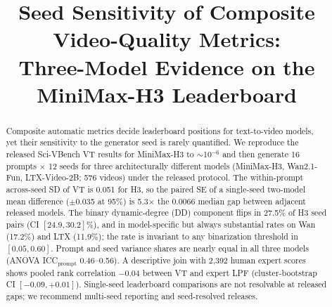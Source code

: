 \documentclass[conference]{IEEEtran}
\begin{document}
\title{Seed Sensitivity of Composite Video-Quality Metrics:\\
Three-Model Evidence on the MiniMax-H3 Leaderboard}
\author{
}
\maketitle

\begin{abstract}
Composite automatic metrics decide leaderboard positions for text-to-video
models, yet their sensitivity to the generator seed is rarely quantified. We
reproduce the released Sci-VBench VT results for MiniMax-H3 to
$\sim$10$^{-6}$ and then generate 16 prompts $\times$ 12 seeds for three
architecturally different models (MiniMax-H3, Wan2.1-Fun, LTX-Video-2B;
576 videos) under the released protocol. The within-prompt across-seed SD of
VT is 0.051 for H3, so the paired SE of a single-seed two-model mean
difference ($\pm$0.035 at 95\%) is 5.3$\times$ the 0.0066 median gap between
adjacent released models. The binary dynamic-degree (DD) component flips in
27.5\% of H3 seed pairs (CI $[24.9,30.2]\%$), and in model-specific but always
substantial rates on Wan (17.2\%) and LTX (11.9\%); the rate is invariant to
any binarization threshold in $[0.05,0.60]$. Prompt and seed variance shares
are nearly equal in all three models (ANOVA ICC$_{\text{prompt}}$ 0.46--0.56).
A descriptive join with 2{,}392 human expert scores shows pooled rank
correlation $-0.04$ between VT and expert LPF (cluster-bootstrap CI
$[-0.09,+0.01]$). Single-seed leaderboard comparisons are not resolvable at
released gaps; we recommend multi-seed reporting and seed-resolved releases.
\end{abstract}
\end{document}
